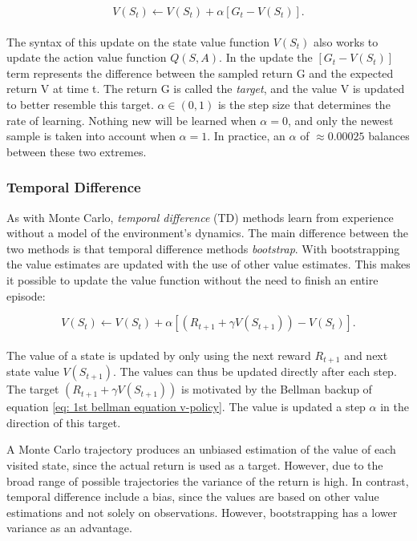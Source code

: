 \begin{equation}
    \label{eq: Monte Carlo Value Update}
    V(S_t) \leftarrow V(S_t) + \alpha [G_t - V(S_t)].
\end{equation}
\\[-2mm] \noindent
The syntax of this update on the state value function $V(S_t)$ also works to update the action value function $Q(S,A)$. In the update the $[G_t - V(S_t)]$ term represents the difference between the sampled return G and the expected return V at time t. The return G is called the \textit{target}, and the value V is updated to better resemble this target. $\alpha \in (0,1)$ is the step size that determines the rate of learning. Nothing new will be learned when $\alpha = 0 $, and only the newest sample is taken into account when $\alpha = 1$. In practice, an $\alpha$ of $\approx 0.00025$ balances between these two extremes. 




\subsubsection*{Temporal Difference}

As with Monte Carlo, \textit{temporal difference} (TD) methods learn from experience without a model of the environment's dynamics. The main difference between the two methods is that temporal difference methods \textit{bootstrap}. With bootstrapping the value estimates are updated with the use of other value estimates. This makes it possible to update the value function without the need to finish an entire episode:

\begin{equation}
    V(S_t) \leftarrow V(S_t) + \alpha [(R_{t+1} + \gamma V(S_{t+1})) - V(S_t)].
\end{equation}
\\[-2mm] \noindent
The value of a state is updated by only using the next reward $R_{t+1}$ and next state value $V(S_{t+1})$. The values can thus be updated directly after each step. The target $(R_{t+1} + \gamma V(S_{t+1}))$ is motivated by the Bellman backup of equation \ref{eq: 1st bellman equation v-policy}. The value is updated a step $\alpha$ in the direction of this target. 

A Monte Carlo trajectory produces an unbiased estimation of the value of each visited state, since the actual return is used as a target. However, due to the broad range of possible trajectories the variance of the return is high. In contrast, temporal difference include a bias, since the values are based on other value estimations and not solely on observations. However, bootstrapping has a lower variance as an advantage. 

